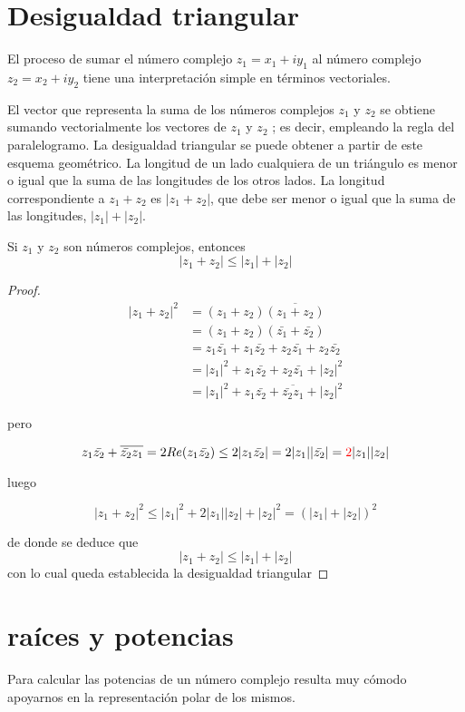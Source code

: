 \documentclass{apuntes}
\begin{document}
\section{Desigualdad triangular}
El proceso de sumar el número complejo $z_1 = x_1 + iy_1$ al número complejo $z_2 = x_2 + iy_2$ tiene una interpretación simple en términos vectoriales.

El vector que representa la suma de los números complejos $z_1$ y $z_2$ se obtiene sumando vectorialmente los vectores de $z_1$ y $z_2$ ; es decir, empleando la regla del paralelogramo. La desigualdad triangular se puede obtener a partir de este esquema
geométrico. La longitud de un lado cualquiera de un triángulo es menor o igual que la suma de las longitudes de los otros lados. La longitud correspondiente a $z_1 + z_2$ es $|z_1 + z_2 |$, que debe ser menor o igual que la suma de las longitudes, $|z_1 | + |z_2 |$.

\begin{prop}
Si $z_1$ y $z_2$ son números complejos, entonces
\[|z_1+z_2|\leq |z_1|+|z_2|\]
\end{prop}
\begin{proof}
\begin{align*}
|z_1+z_2|^2 & = (z_1+z_2)\overline{(z_1+z_2)} \\
& = (z_1+z_2)(\bar{z_1}+\bar{z_2}) \\
& = z_1\bar{z_1}+z_1\bar{z_2}+z_2\bar{z_1}+z_2\bar{z_2} \\
& = |z_1|^2+z_1\bar{z_2}+z_2\bar{z_1}+|z_2|^2 \\
& = |z_1|^2+z_1\bar{z_2}+\overline{\bar{z_2}z_1}+|z_2|^2
\end{align*}

pero

\[z_1\bar{z_2}+\overline{\bar{z_2}z_1} = 2 Re(z_1\bar{z_2}) \leq 2|z_1\bar{z_2}| = 2 |z_1||\bar{z_2}| = \textcolor{red}{2}|z_1||z_2|\]

luego

\[|z_1+z_2|^2 \leq |z_1|^2+2|z_1||z_2|+|z_2|^2 = (|z_1|+|z_2|)^2\]

de donde se deduce que
\[|z_1+z_2| \leq |z_1|+|z_2|\]
con lo cual queda establecida la desigualdad triangular
\end{proof}

\section{raíces y potencias}
Para calcular las potencias de un número complejo resulta muy cómodo apoyarnos en la representación polar de los mismos.
\end{document}
